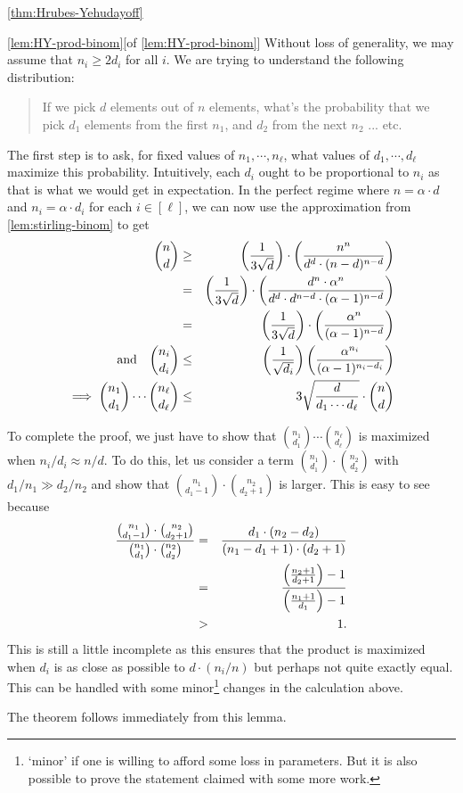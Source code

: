 \begin{proofof}{\autoref{thm:Hrubes-Yehudayoff}}
\begin{myproof}{\autoref{lem:HY-prod-binom}}[of \autoref{lem:HY-prod-binom}]
Without loss of generality, we may assume that $n_i \geq 2d_i$ for all $i$. We are trying to understand the following distribution:
\begin{quote}
  If we pick $d$ elements out of $n$ elements, what's the probability that we pick $d_1$ elements from the first $n_1$, and $d_2$ from the next $n_2$ ... etc. 
\end{quote}
The first step is to ask, for fixed values of $n_1, \cdots, n_\ell$, what values of $d_1, \cdots, d_\ell$ maximize this probability. Intuitively, each $d_i$ ought to be proportional to $n_i$ as that is what we would get in expectation. In the perfect regime where $n = \alpha \cdot  d$ and  $n_i = \alpha \cdot d_i$ for each $i \in [\ell]$, we can now use the approximation from \autoref{lem:stirling-binom} to get
\begin{eqnarray*}
\binom{n}{d} & \geq  &  \left(\frac{1}{3\sqrt{d}}\right) \cdot \left(\frac{n^n}{d^d \cdot (n-d)^{n-d}}\right)\\
 & = & \left(\frac{1}{3\sqrt{d}}\right) \cdot \left(\frac{d^n \cdot \alpha^n}{d^d \cdot d^{n-d} \cdot (\alpha - 1)^{n-d}}\right)\\
 & = & \left(\frac{1}{3\sqrt{d}}\right) \cdot \left(\frac{\alpha^n}{(\alpha - 1)^{n-d}}\right)\\
\text{and} \quad\binom{n_i}{d_i} & \leq  &  \left(\frac{1}{\sqrt{d_i}}\right) \left(\frac{\alpha^{n_i}}{(\alpha - 1)^{n_i-d_i}}\right)\\
\implies \binom{n_1}{d_1} \cdots \binom{n_\ell}{d_\ell}  & \leq & 3 \sqrt{\frac{d}{d_1 \cdots d_\ell}} \cdot \binom{n}{d}
\end{eqnarray*}

To complete the proof, we just have to show that $\binom{n_1}{d_1} \cdots \binom{n_\ell}{d_\ell}$ is maximized when $n_i/d_i \approx n/d$.
To do this, let us consider a term $\binom{n_1}{d_1} \cdot \binom{n_2}{d_2}$ with $d_1/n_1 \gg d_2/n_2$ and show that $\binom{n_1}{d_1 - 1} \cdot \binom{n_2}{d_2 + 1}$ is larger.
This is easy to see because
\begin{eqnarray*}
\frac{\binom{n_1}{d_1 - 1} \cdot \binom{n_2}{d_2 + 1}}{\binom{n_1}{d_1} \cdot \binom{n_2}{d_2}} & = & \frac{d_1 \cdot (n_2 - d_2)}{(n_1 - d_1 + 1) \cdot (d_2 + 1)}\\
 & = & \frac{\left(\frac{n_2 + 1}{d_2 + 1}\right) - 1 }{\left(\frac{n_1 + 1}{d_1}\right) - 1}\\
 & > & 1.
\end{eqnarray*}
This is still a little incomplete as this ensures that the product is maximized when $d_i$ is as close as possible to $d \cdot (n_i/n)$ but perhaps not quite exactly equal. This can be handled with some minor\footnote{`minor' if one is willing to afford some loss in parameters. But it is also possible to prove the statement claimed with some more work.} changes in the calculation above.  
\end{myproof}

\noindent
The theorem follows immediately from this lemma. 
\end{proofof}

